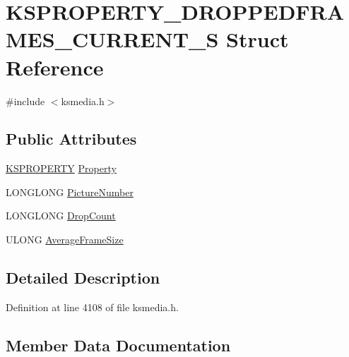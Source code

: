 \hypertarget{struct_k_s_p_r_o_p_e_r_t_y___d_r_o_p_p_e_d_f_r_a_m_e_s___c_u_r_r_e_n_t___s}{}\section{K\+S\+P\+R\+O\+P\+E\+R\+T\+Y\+\_\+\+D\+R\+O\+P\+P\+E\+D\+F\+R\+A\+M\+E\+S\+\_\+\+C\+U\+R\+R\+E\+N\+T\+\_\+S Struct Reference}
\label{struct_k_s_p_r_o_p_e_r_t_y___d_r_o_p_p_e_d_f_r_a_m_e_s___c_u_r_r_e_n_t___s}


{\ttfamily \#include $<$ksmedia.\+h$>$}

\subsection*{Public Attributes}
\begin{DoxyCompactItemize}
\item 
\hyperlink{ks_8h_a4392f77c74e868d813d46c39ada4d660}{K\+S\+P\+R\+O\+P\+E\+R\+TY} \hyperlink{struct_k_s_p_r_o_p_e_r_t_y___d_r_o_p_p_e_d_f_r_a_m_e_s___c_u_r_r_e_n_t___s_a3f6ca0258e95d6705e2224321e5a1370}{Property}
\item 
L\+O\+N\+G\+L\+O\+NG \hyperlink{struct_k_s_p_r_o_p_e_r_t_y___d_r_o_p_p_e_d_f_r_a_m_e_s___c_u_r_r_e_n_t___s_aad77435ca58f1a6a35536b93948ab3d4}{Picture\+Number}
\item 
L\+O\+N\+G\+L\+O\+NG \hyperlink{struct_k_s_p_r_o_p_e_r_t_y___d_r_o_p_p_e_d_f_r_a_m_e_s___c_u_r_r_e_n_t___s_add7ad34faf7ec79998b8c9ead3b24d99}{Drop\+Count}
\item 
U\+L\+O\+NG \hyperlink{struct_k_s_p_r_o_p_e_r_t_y___d_r_o_p_p_e_d_f_r_a_m_e_s___c_u_r_r_e_n_t___s_a1fa84a6f0469e8372f1f2ddd965d4324}{Average\+Frame\+Size}
\end{DoxyCompactItemize}


\subsection{Detailed Description}


Definition at line 4108 of file ksmedia.\+h.



\subsection{Member Data Documentation}
